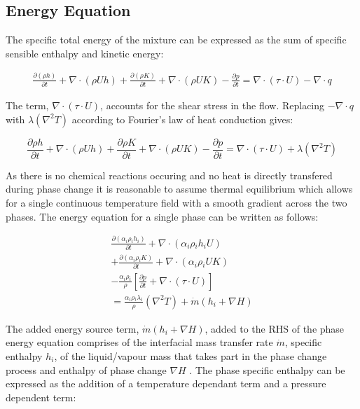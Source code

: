 \documentclass{article}
\begin{document}
\subsection{Energy Equation}

The specific total energy of the mixture can be expressed as the sum of specific sensible enthalpy and kinetic energy:

\begin{equation}
\begin{split}
\frac{\partial(\rho{h})}{\partial{t}} + \nabla\cdot(\rho{U}h)+\frac{\partial(\rho{K})}{\partial{t}} + \nabla\cdot(\rho{U}K)-\frac{\partial{p}}{\partial{t}} = \nabla\cdot(\tau \cdot U) - \nabla\cdot q
\end{split}
\end{equation}

The term, $\nabla\cdot(\tau\cdot U)$, accounts for the shear stress in the flow. Replacing $-\nabla\cdot q$ with $\lambda({\nabla}^2 T)$ according to Fourier's law of heat conduction \cite{jasa96,yu18} gives:

\begin{equation}
\frac{\partial{\rho h}}{\partial{t}} + \nabla\cdot(\rho U h) + \frac{\partial{\rho K}}{\partial{t}} + \nabla\cdot(\rho U K) - \frac{\partial{p}}{\partial{t}} = \nabla\cdot(\tau\cdot U) + \lambda({\nabla}^2 T)
\end{equation}

As there is no chemical reactions occuring and no heat is directly transfered during phase change it is reasonable to assume thermal equilibrium which allows for a single continuous temperature field with a smooth gradient across the two phases. The energy equation for a single phase can be written as follows:

\begin{equation}
\begin{split}
\frac{\partial(\alpha{_i}\rho{_i}h_i)}{\partial{t}} + \nabla\cdot(\alpha{_i}\rho{_i}h_i U) \\
 + \frac{\partial(\alpha{_i}\rho{_i}K)}{\partial{t}} + \nabla\cdot(\alpha{_i}\rho{_i}U K) \\
- \frac{\alpha{_i}\rho{_i}}{\rho}\left[\frac{\partial{p}}{\partial{t}} + \nabla\cdot(\tau\cdot U)\right] \\
= \frac{\alpha{_i}\rho{_i}\lambda{_i}}{\rho}({\nabla}^2 T) + \dot{m}(h_i + \nabla H)
\end{split}
\end{equation}

The added energy source term, $\dot{m}(h_i + \nabla H)$, added to the RHS of the phase energy equation comprises of the interfacial mass transfer rate $\dot{m}$, specific enthalpy $h_i$, of the liquid/vapour mass that takes part in the phase change process and enthalpy of phase change $\nabla H$ \cite{yu18}. The phase specific enthalpy can be expressed as the addition of a temperature dependant term and a pressure dependent term:
\end{document}
